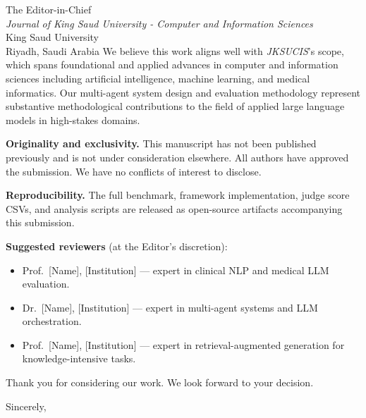 \documentclass[11pt,a4paper]{letter}
\begin{document}
\begin{letter}{%
The Editor-in-Chief\\
\textit{Journal of King Saud University - Computer and Information Sciences}\\
King Saud University\\
Riyadh, Saudi Arabia}
We believe this work aligns well with \textit{JKSUCIS}'s scope, which
spans foundational and applied advances in computer and information
sciences including artificial intelligence, machine learning, and
medical informatics. Our multi-agent system design and evaluation
methodology represent substantive methodological contributions to the
field of applied large language models in high-stakes domains.

\textbf{Originality and exclusivity.} This manuscript has not been
published previously and is not under consideration elsewhere. All
authors have approved the submission. We have no conflicts of
interest to disclose.

\textbf{Reproducibility.} The full benchmark, framework
implementation, judge score CSVs, and analysis scripts are released
as open-source artifacts accompanying this submission.

\textbf{Suggested reviewers} (at the Editor's discretion):

\begin{itemize}
\item Prof.\ [Name], [Institution] --- expert in clinical NLP and
  medical LLM evaluation.
\item Dr.\ [Name], [Institution] --- expert in multi-agent systems
  and LLM orchestration.
\item Prof.\ [Name], [Institution] --- expert in retrieval-augmented
  generation for knowledge-intensive tasks.
\end{itemize}

Thank you for considering our work. We look forward to your decision.

\closing{Sincerely,}

\end{letter}
\end{document}
